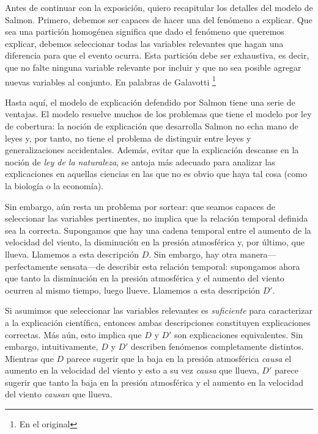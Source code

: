 Antes de continuar con la exposición, quiero recapitular
los detalles del modelo de Salmon. Primero, debemos ser
capaces de hacer una  del
fenómeno a explicar. Que sea una partición homogénea
significa que dado el fenómeno que queremos explicar,
debemos seleccionar todas las variables relevantes que
hagan una diferencia para que el evento ocurra. Esta
partición debe ser exhaustiva, es decir, que no falte
ninguna variable relevante por incluir y que no sea
posible agregar nuevas variables al conjunto. En palabras
de Galavotti \parencite{Galavotti2018}\footnote{
  En el original 
} 

Hasta aquí, el modelo de explicación defendido por Salmon
tiene una serie de ventajas. El modelo resuelve muchos de
los problemas que tiene el modelo por ley de cobertura: la
noción de explicación que desarrolla Salmon no echa mano de
leyes y, por tanto, no tiene el problema de distinguir entre
leyes y generalizaciones accidentales. Además, evitar que la
explicación descanse en la noción de \emph{ley de la
naturaleza}, se antoja más adecuado para analizar las
explicaciones en aquellas ciencias en las que no es obvio
que haya tal cosa (como la biología o la economía).

Sin embargo, aún resta un problema por sortear: que seamos
capaces de seleccionar las variables pertinentes, no implica
que la relación temporal definida sea la correcta.
Supongamos que hay una cadena temporal entre el aumento de
la velocidad del viento, la disminución en la presión
atmosférica y, por último, que llueva. Llamemos a esta
descripción $ D $. Sin embargo, hay otra
manera---perfectamente sensata---de describir esta relación
temporal: supongamos ahora que tanto la disminución en la
presión atmosférica y el aumento del viento ocurren al mismo
tiempo, luego llueve. Llamemos a esta descripción $ D' $.

Si asumimos que seleccionar las variables relevantes es
\emph{suficiente} para caracterizar a la explicación
científica, entonces ambas descripciones constituyen
explicaciones correctas. Más aún, esto implica que $ D  $ y
$  D' $ son explicaciones equivalentes. Sin embargo,
intuitivamente, $ D $ y $ D' $ describen fenómenos
completamente distintos. Mientras que $ D $ parece sugerir
que la baja en la presión atmosférica \emph{causa} el
aumento en la velocidad del viento y esto a su vez
\emph{causa} que llueva, $ D' $ parece sugerir que tanto la
baja en la presión atmosférica y el aumento en la velocidad
del viento \emph{causan} que llueva.

